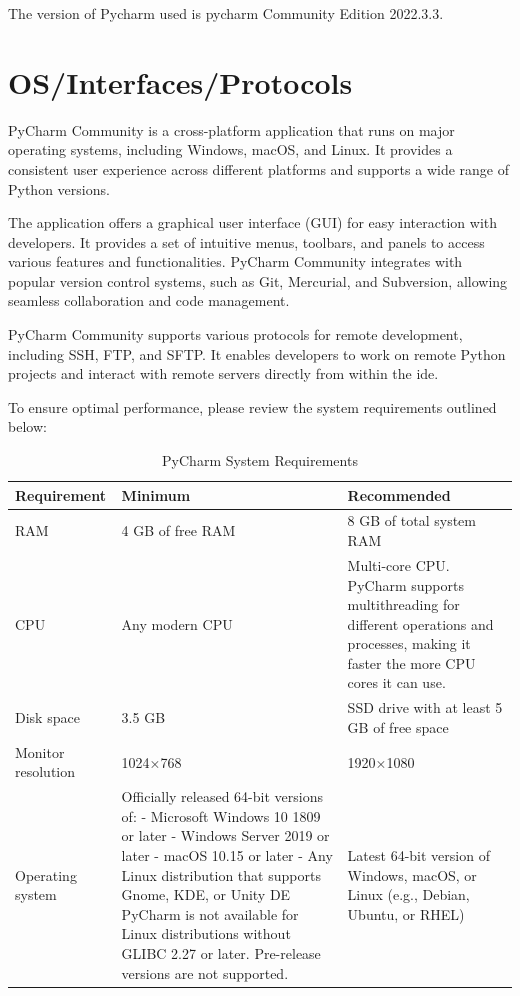 The version of Pycharm used is pycharm Community Edition 2022.3.3.


\section{OS/Interfaces/Protocols}
PyCharm Community is a cross-platform application that runs on major operating systems, including Windows, macOS, and Linux. It provides a consistent user experience across different platforms and supports a wide range of Python versions.

The application offers a graphical user interface (GUI) for easy interaction with developers. It provides a set of intuitive menus, toolbars, and panels to access various features and functionalities. PyCharm Community integrates with popular version control systems, such as Git, Mercurial, and Subversion, allowing seamless collaboration and code management.

PyCharm Community supports various protocols for remote development, including SSH, FTP, and SFTP. It enables developers to work on remote Python projects and interact with remote servers directly from within the \ac{ide}.

To ensure optimal performance, please review the system requirements outlined below:

\begin{table}[h!]
	\centering
	\caption{PyCharm System Requirements}
	\label{tab:system-requirements}
	\begin{tabular}{|p{3cm}|p{4cm}|p{4cm}|}
		\hline
		\textbf{Requirement} & \textbf{Minimum} & \textbf{Recommended} \\ \hline
		RAM & 4 GB of free RAM & 8 GB of total system RAM \\ \hline
		CPU & Any modern CPU & Multi-core CPU. PyCharm supports multithreading for different operations and processes, making it faster the more CPU cores it can use. \\ \hline
		Disk space & 3.5 GB & SSD drive with at least 5 GB of free space \\ \hline
		Monitor resolution & 1024×768 & 1920×1080 \\ \hline
		Operating system & Officially released 64-bit versions of: 
		- Microsoft Windows 10 1809 or later
		- Windows Server 2019 or later
		- macOS 10.15 or later
		- Any Linux distribution that supports Gnome, KDE, or Unity DE
		PyCharm is not available for Linux distributions without GLIBC 2.27 or later.
		Pre-release versions are not supported. & Latest 64-bit version of Windows, macOS, or Linux (e.g., Debian, Ubuntu, or RHEL) \\ \hline
	\end{tabular}
\end{table}



